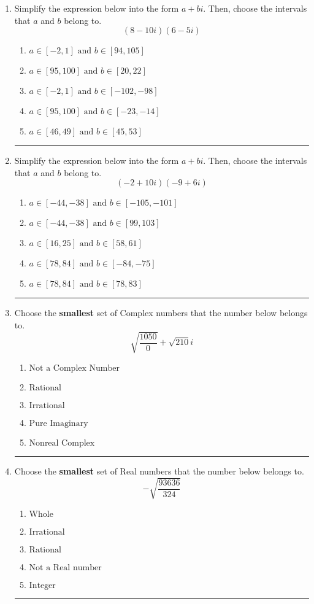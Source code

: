 \documentclass[14pt]{extbook}
\newcommand{\litem}[1]{\item#1\hspace*{-1cm}\rule{\textwidth}{0.4pt}}
\begin{document}
\begin{enumerate}
{\begin{enumerate}[label=\Alph*.]
\end{enumerate} }
\litem{
Simplify the expression below into the form $a+bi$. Then, choose the intervals that $a$ and $b$ belong to.\[ (8 - 10 i)(6 - 5 i) \]\begin{enumerate}[label=\Alph*.]
\item \( a \in [-2, 1] \text{ and } b \in [94, 105] \)
\item \( a \in [95, 100] \text{ and } b \in [20, 22] \)
\item \( a \in [-2, 1] \text{ and } b \in [-102, -98] \)
\item \( a \in [95, 100] \text{ and } b \in [-23, -14] \)
\item \( a \in [46, 49] \text{ and } b \in [45, 53] \)

\end{enumerate} }
\litem{
Simplify the expression below into the form $a+bi$. Then, choose the intervals that $a$ and $b$ belong to.\[ (-2 + 10 i)(-9 + 6 i) \]\begin{enumerate}[label=\Alph*.]
\item \( a \in [-44, -38] \text{ and } b \in [-105, -101] \)
\item \( a \in [-44, -38] \text{ and } b \in [99, 103] \)
\item \( a \in [16, 25] \text{ and } b \in [58, 61] \)
\item \( a \in [78, 84] \text{ and } b \in [-84, -75] \)
\item \( a \in [78, 84] \text{ and } b \in [78, 83] \)

\end{enumerate} }
\litem{
Choose the \textbf{smallest} set of Complex numbers that the number below belongs to.\[ \sqrt{\frac{1050}{0}}+\sqrt{210} i \]\begin{enumerate}[label=\Alph*.]
\item \( \text{Not a Complex Number} \)
\item \( \text{Rational} \)
\item \( \text{Irrational} \)
\item \( \text{Pure Imaginary} \)
\item \( \text{Nonreal Complex} \)

\end{enumerate} }
\litem{
Choose the \textbf{smallest} set of Real numbers that the number below belongs to.\[ -\sqrt{\frac{93636}{324}} \]\begin{enumerate}[label=\Alph*.]
\item \( \text{Whole} \)
\item \( \text{Irrational} \)
\item \( \text{Rational} \)
\item \( \text{Not a Real number} \)
\item \( \text{Integer} \)


\end{enumerate}}
\end{enumerate}
\end{document}
